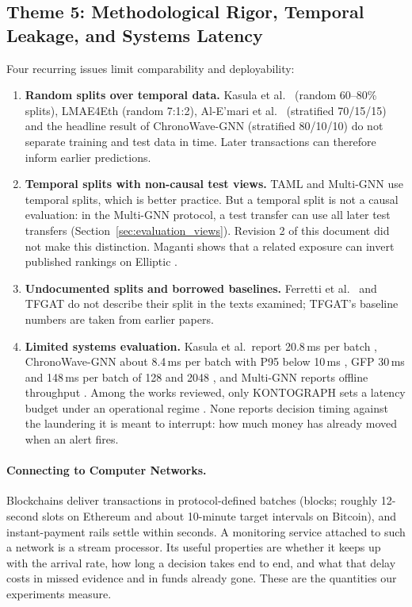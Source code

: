\documentclass[11pt,a4paper]{article}
\begin{document}
\subsection{Theme 5: Methodological Rigor, Temporal Leakage, and Systems Latency}
Four recurring issues limit comparability and deployability:
\begin{enumerate}[leftmargin=*]
    \item \textbf{Random splits over temporal data.} Kasula et al.\ \cite{kasula2025ajk} (random 60--80\% splits), LMAE4Eth \cite{jia2025lmae4eth} (random 7:1:2), Al-E'mari et al.\ \cite{alemari2026explainable} (stratified 70/15/15) and the headline result of ChronoWave-GNN \cite{lin2026chronowave} (stratified 80/10/10) do not separate training and test data in time. Later transactions can therefore inform earlier predictions.
    \item \textbf{Temporal splits with non-causal test views.} TAML \cite{rico2026taml} and Multi-GNN \cite{egressy2024multigraph} use temporal splits, which is better practice. But a temporal split is not a causal evaluation: in the Multi-GNN protocol, a test transfer can use all later test transfers (Section~\ref{sec:evaluation_views}). Revision 2 of this document did not make this distinction. Maganti shows that a related exposure can invert published rankings on Elliptic \cite{maganti2026liability}.
    \item \textbf{Undocumented splits and borrowed baselines.} Ferretti et al.\ \cite{ferretti2025aml} and TFGAT \cite{li2025tfgat} do not describe their split in the texts examined; TFGAT's baseline numbers are taken from earlier papers.
    \item \textbf{Limited systems evaluation.} Kasula et al.\ report 20.8\,ms per batch \cite{kasula2025ajk}, ChronoWave-GNN about 8.4\,ms per batch with P95 below 10\,ms \cite{lin2026chronowave}, GFP 30\,ms and 148\,ms per batch of 128 and 2048 \cite{blanusa2024gfp}, and Multi-GNN reports offline throughput \cite{egressy2024multigraph}. Among the works reviewed, only KONTOGRAPH sets a latency budget under an operational regime \cite{abolfadl2026kontograph}. None reports decision timing against the laundering it is meant to interrupt: how much money has already moved when an alert fires.
\end{enumerate}

\paragraph{Connecting to Computer Networks.} Blockchains deliver transactions in protocol-defined batches (blocks; roughly 12-second slots on Ethereum and about 10-minute target intervals on Bitcoin), and instant-payment rails settle within seconds. A monitoring service attached to such a network is a stream processor. Its useful properties are whether it keeps up with the arrival rate, how long a decision takes end to end, and what that delay costs in missed evidence and in funds already gone. These are the quantities our experiments measure.
\end{document}
